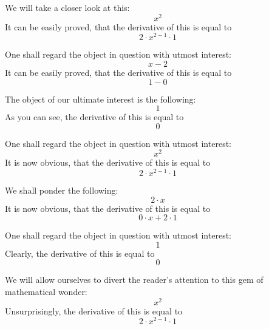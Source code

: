 \documentclass{article}
\begin{document}
We will take a closer look at this:
\begin{equation}
x ^{2 } 
\end{equation}
It can be easily proved, that the derivative of this is equal to
\begin{equation}
2 \cdot x ^{2 - 1 } \cdot 1 
\end{equation}

One shall regard the object in question with utmost interest:
\begin{equation}
x - 2 
\end{equation}
It can be easily proved, that the derivative of this is equal to
\begin{equation}
1 - 0 
\end{equation}

The object of our ultimate interest is the following:
\begin{equation}
1 
\end{equation}
As you can see, the derivative of this is equal to
\begin{equation}
0 
\end{equation}

One shall regard the object in question with utmost interest:
\begin{equation}
x ^{2 } 
\end{equation}
It is now obvious, that the derivative of this is equal to
\begin{equation}
2 \cdot x ^{2 - 1 } \cdot 1 
\end{equation}

We shall ponder the following:
\begin{equation}
2 \cdot x 
\end{equation}
It is now obvious, that the derivative of this is equal to
\begin{equation}
0 \cdot x + 2 \cdot 1 
\end{equation}

One shall regard the object in question with utmost interest:
\begin{equation}
1 
\end{equation}
Clearly, the derivative of this is equal to
\begin{equation}
0 
\end{equation}

We will allow ourselves to divert the reader's attention to this gem of mathematical wonder:
\begin{equation}
x ^{2 } 
\end{equation}
Unsurprisingly, the derivative of this is equal to
\begin{equation}
2 \cdot x ^{2 - 1 } \cdot 1 
\end{equation}
\end{document}
